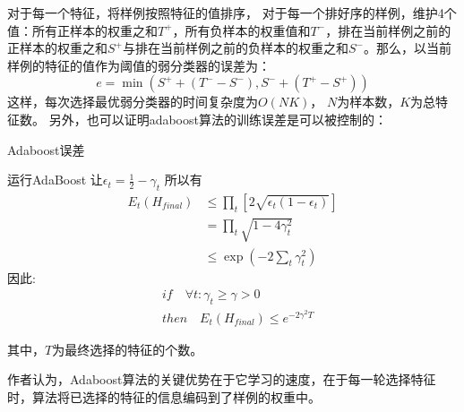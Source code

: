 对于每一个特征，将样例按照特征的值排序，
对于每一个排好序的样例，维护4个值：所有正样本的权重之和$T^+$，所有负样本的权重值和$T^-$，排在当前样例之前的正样本的权重之和$S^+$与排在当前样例之前的负样本的权重之和$S^-$。那么，以当前样例的特征的值作为阈值的弱分类器的误差为：
$$e = \min(S^+ + (T^- - S^-), S^-  + ( T^+ - S^+))$$
这样，每次选择最优弱分类器的时间复杂度为$O(NK)$， $N$为样本数，$K$为总特征数。
另外，也可以证明adaboost算法的训练误差是可以被控制的：
\begin{algorithm}
\caption{Adaboost误差}
    \begin{algorithmic}[1] 
    \State 运行AdaBoost
    \State 让$\epsilon_t=\frac{1}{2}-\gamma_t$
    \State 所以有
    $$
        \begin{aligned}
            E_t(H_{final})& \leq \prod_t[2\sqrt{\epsilon_t(1-\epsilon_t)}]\\
            & = \prod_t\sqrt{1-4\gamma_t^2}\\
            & \leq \exp(-2\sum_t\gamma_t^2)
        \end{aligned}
    $$
    \State 因此:$$
        \begin{aligned}
            &if \quad \forall t: \gamma_t \geq \gamma > 0\\
            &then \quad E_t(H_{final}) \leq e^{-2\gamma^2T}
        \end{aligned}
    $$
    \end{algorithmic}
\end{algorithm}

其中，$T$为最终选择的特征的个数。

作者认为，Adaboost算法的关键优势在于它学习的速度，在于每一轮选择特征时，算法将已选择的特征的信息编码到了样例的权重中。

